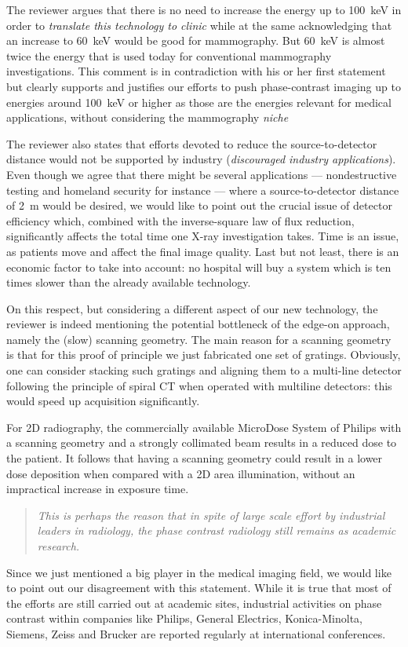 \documentclass[a4paper,english]{scrartcl}
\newcommand{\reviewer}[1]{\emph{#1}}
\newenvironment{reviewerquote}{\begin{quote}\itshape}{\end{quote}}
\begin{document}
The reviewer argues that
there is no need to increase the energy up to \SI{100}{\kilo\eV} in order to
\reviewer{translate
this technology to clinic} while at the same acknowledging that 
an increase to \SI{60}{\kilo\eV} would be good for mammography. But
\SI{60}{\kilo\eV} is almost twice
the energy that is used today for conventional mammography
investigations. This comment is in contradiction with his or her first
statement but clearly supports and justifies our efforts to push phase-contrast
imaging up to energies around \SI{100}{\kilo\eV} or higher as those are the energies
relevant for medical applications, without considering the mammography
\emph{niche}

 The reviewer also states that efforts devoted to reduce the
 source-to-detector distance would not be supported by industry
 (\reviewer{discouraged industry applications}). Even though we agree that there
 might be several applications --- nondestructive testing and homeland
 security for instance --- where a source-to-detector distance of
 \SI{2}{\metre} would be
 desired, we would like to point out the crucial issue of detector
 efficiency which, combined with the inverse-square law of flux reduction,
 significantly affects the total time one X-ray investigation takes. Time is
 an issue, as patients move and affect the final image quality. Last but not
 least, there is an economic factor to take into account: no hospital will
 buy a system which is ten times slower than the already available technology.

 On this respect, but considering a different aspect of our new technology,
 the reviewer is indeed mentioning the potential bottleneck
 of the edge-on approach, namely the 
 (slow) scanning geometry. The
 main reason for a scanning geometry is that for this proof of principle we just fabricated one set of
 gratings. Obviously, one can consider stacking such gratings and aligning
 them to a multi-line detector following the  principle of spiral CT when
 operated with multiline detectors: this would speed up acquisition
 significantly.
 
 For 2D radiography, the commercially available MicroDose System of
 Philips with a scanning geometry and a strongly collimated beam 
 results in a reduced dose to the patient. It follows that having a scanning
 geometry could result in a lower dose deposition when compared with a 2D
 area illumination, without an impractical increase in exposure time.

 \begin{reviewerquote}
     This is perhaps the reason that in spite of large
     scale effort by industrial leaders in radiology, the phase contrast
     radiology still remains as academic research.
 \end{reviewerquote}
 Since we just mentioned a big player in the medical imaging field, we
 would like to point out our disagreement with this statement. While it is
 true that most of the efforts are still carried out at academic sites,
 industrial activities on phase contrast within companies like Philips,
 General Electrics, Konica-Minolta, Siemens, Zeiss and Brucker are reported
 regularly at international conferences.
\end{document}
